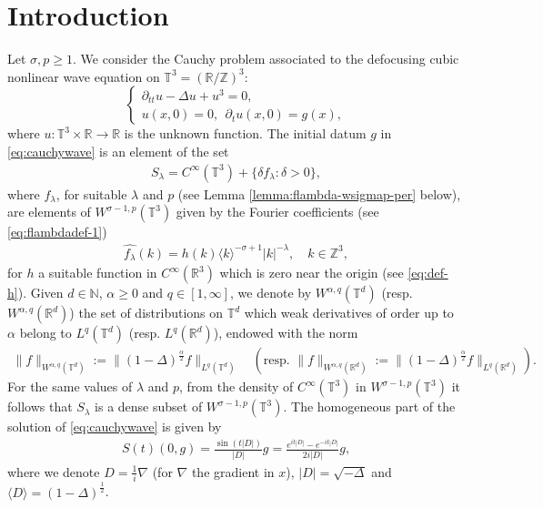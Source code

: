 \documentclass[a4paper, reqno, 11pt]{amsart}
\theoremstyle{definition}
\begin{document}
	\section{Introduction}\label{sec:intro}
	Let $\sigma,p \geq 1$. We consider the Cauchy problem associated to the defocusing cubic nonlinear wave equation on $\mathbb{T}^3 = (\mathbb{R}/\mathbb{Z})^3$:
		\begin{equation}\label{eq:cauchywave}
			\left\{
			\begin{array}{l}
				\partial_{tt} u - \Delta u + u^3 = 0,
				\\
				u(x,0) = 0,  \ \ \partial_tu(x,0) = g(x),
			\end{array}
			\right.
		\end{equation}
		where $u:\mathbb{T}^3 \times \mathbb{R} \rightarrow \mathbb{R}$ is the unknown function. The initial datum $g$ in \eqref{eq:cauchywave} is an element of the set
	\begin{align}\label{eq:family-S}
	S_{\lambda} = C^{\infty}(\mathbb{T}^3) + \{\delta f_{\lambda} : \delta > 0\},
	\end{align}
	where $f_{\lambda}$, for suitable $\lambda$ and $p$ (see Lemma \ref{lemma:flambda-wsigmap-per} below), are elements of $W^{\sigma-1,p}(\mathbb{T}^3)$ given by the Fourier coefficients (see \eqref{eq:flambdadef-1})
\begin{align}\label{eq:flambdadef}
\widehat{f_{\lambda}}(k) =  h(k) \langle k \rangle^{-\sigma+1} |k|^{-\lambda}, \quad k \in \mathbb{Z}^3,
\end{align}	
for $h$ a suitable function in $C^{\infty}(\mathbb{R}^3)$ which is zero near the origin (see \eqref{eq:def-h}). Given $d \in \mathbb{N}$, $\alpha \geq 0$ and $q \in [1,\infty]$, we denote by $W^{\alpha,q}(\mathbb{T}^d)$ (resp. $W^{\alpha,q}(\mathbb{R}^d)$) the set of distributions on $\mathbb{T}^d$ which weak derivatives of order up to $\alpha$ belong to $L^q(\mathbb{T}^d)$ (resp. $L^q(\mathbb{R}^d)$), endowed with the norm
        \begin{align*}
            \|f\|_{W^{\alpha,q}(\mathbb{T}^d)} := \|(1-\Delta)^{\frac{\alpha}{2}}f\|_{L^q(\mathbb{T}^d)} \quad (\text{resp. } \|f\|_{W^{\alpha,q}(\mathbb{R}^d)} := \|(1-\Delta)^{\frac{\alpha}{2}}f\|_{L^q(\mathbb{R}^d)} ).
        \end{align*} 
        For the same values of $\lambda$ and $p$, from the density of $C^{\infty}(\mathbb{T}^3)$ in $W^{\sigma-1,p}(\mathbb{T}^3)$ it follows that $S_{\lambda}$ is a dense subset of $W^{\sigma-1,p}(\mathbb{T}^3)$.  The homogeneous part of the solution of \eqref{eq:cauchywave} is given by
\begin{align}\label{eq:linearflow-flambda}
S(t)(0,g) = \frac{\sin(t|D|)}{|D|}g = \frac{e^{it|D|} - e^{-it|D|}}{2i|D|}g,
\end{align} 
where we denote $D = \frac{1}{i} \nabla$ (for $\nabla$ the gradient in $x$), $|D| = \sqrt{-\Delta}$ and $\langle D \rangle = (1-\Delta)^{\frac{1}{2}}$.
\end{document}
